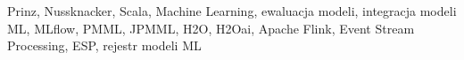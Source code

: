 Prinz, Nussknacker, Scala, Machine Learning, ewaluacja modeli, integracja modeli ML, MLflow, PMML, JPMML, H2O, H2Oai,
Apache Flink, Event Stream Processing, ESP, rejestr modeli ML
